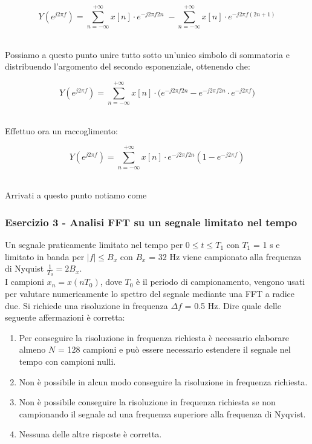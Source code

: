 \documentclass[../main.tex]{subfiles}
\begin{document}
\[ Y(e^{j2\pi f}) = \sum_{n = -\infty}^{+\infty} x[n] \cdot e^{-j2\pi f 2n} \;-  \sum_{n = -\infty}^{+\infty}  x[n] \cdot e^{-j2\pi f (2n + 1)}  \]\

Possiamo a questo punto unire tutto sotto un'unico simbolo di sommatoria e distribuendo l'argomento del secondo esponenziale, ottenendo che:

\[ Y(e^{j2\pi f}) = \sum_{n = -\infty}^{+\infty}  x[n] \cdot \big( e^{-j2\pi f 2n} - e^{-j2\pi f 2n} \cdot  e^{-j2\pi f} \big) \]\ 

Effettuo ora un raccoglimento:

\[ Y(e^{j2\pi f}) = \sum_{n = -\infty}^{+\infty}  x[n] \cdot  e^{-j2\pi f 2n} (1 - e^{-j2\pi f} )\]\

Arrivati a questo punto notiamo come 







\subsubsection{Esercizio 3 - Analisi FFT su un segnale limitato nel tempo}

Un segnale praticamente limitato nel tempo per $0 \leq t \leq T_1$ con $T_1$ = 1 s e limitato in banda per $|f| \leq B_x$ con $B_x$ = 32 Hz viene campionato alla
frequenza di Nyquist $\tfrac{1}{T_0} = 2B_x$. \\ I campioni $x_n = x(nT_0)$, dove $T_0$ è il periodo di campionamento, vengono usati per valutare numericamente lo spettro del segnale mediante una FFT a radice due. Si richiede una risoluzione in
frequenza $\Delta f$ = 0.5 Hz. Dire quale delle seguente affermazioni è corretta:

\begin{enumerate}
	\item[\textbf{1)}] Per conseguire la risoluzione in frequenza richiesta è necessario elaborare almeno $N$ = 128 campioni e può essere necessario estendere il segnale nel tempo con campioni nulli.
	\item[\textbf{2)}] Non è possibile in alcun modo conseguire la risoluzione in frequenza richiesta.
	\item[\textbf{3)}] Non è possibile conseguire la risoluzione in frequenza richiesta se non campionando il segnale ad una frequenza superiore alla frequenza di Nyqvist.
	\item[\textbf{4)}] Nessuna delle altre risposte è corretta.
\end{enumerate}
\end{document}
